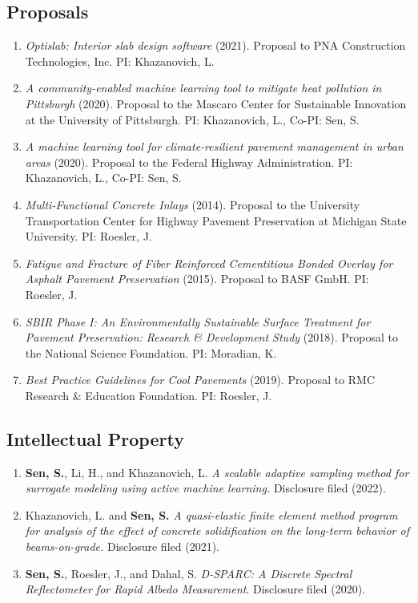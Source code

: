 \documentclass[12pt]{article}
\begin{document}
\hfill
\subsection*{Proposals}
\begin{enumerate}[label=(P\arabic*)]
	\item \textit{Optislab: Interior slab design software} (2021). Proposal to PNA Construction Technologies, Inc. PI: Khazanovich, L.
	\item \textit{A community-enabled machine learning tool to mitigate heat pollution in Pittsburgh} (2020). Proposal to the Mascaro Center for Sustainable Innovation at the University of Pittsburgh. PI: Khazanovich, L., Co-PI: Sen, S.
	\item \textit{A machine learning tool for climate-resilient pavement management in urban areas} (2020). Proposal to the Federal Highway Administration. PI: Khazanovich, L., Co-PI: Sen, S.  
	\item \textit{Multi-Functional Concrete Inlays} (2014). Proposal to the University Transportation Center for Highway Pavement Preservation at Michigan State University. PI: Roesler, J. 
	\item \textit{Fatigue and Fracture of Fiber Reinforced Cementitious Bonded Overlay for Asphalt Pavement Preservation} (2015). Proposal to BASF GmbH. PI: Roesler, J. 
	\item \textit{SBIR Phase I: An Environmentally Sustainable Surface Treatment for Pavement Preservation: Research \& Development Study} (2018). Proposal to the National Science Foundation. PI: Moradian, K.
	\item \textit{Best Practice Guidelines for Cool Pavements} (2019). Proposal to RMC Research \& Education Foundation. PI: Roesler, J.
\end{enumerate}

\hfill
\subsection*{Intellectual Property}
\begin{enumerate}[label=(IP\arabic*)]
	\item \textbf{Sen, S.}, Li, H., and  Khazanovich, L. \textit{A scalable adaptive sampling method for surrogate modeling using active machine learning.} Disclosure filed (2022).
	\item Khazanovich, L. and \textbf{Sen, S.} \textit{A quasi-elastic finite element method program for analysis of the effect of concrete solidification on the long-term behavior of beams-on-grade.} Disclosure filed (2021).
	\item \textbf{Sen, S.}, Roesler, J., and Dahal, S. \textit{D-SPARC: A Discrete Spectral Reflectometer for Rapid Albedo Measurement}. Disclosure filed (2020). 
\end{enumerate} 
\end{document}
